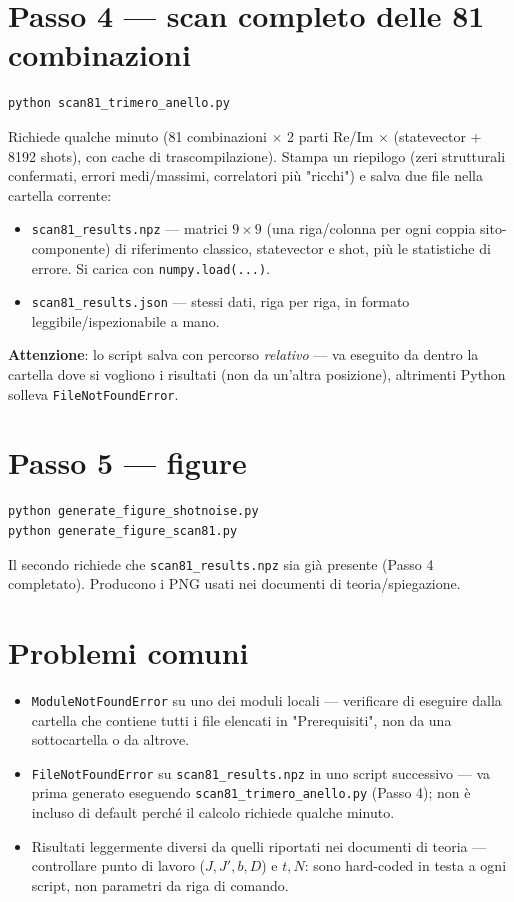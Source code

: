 \documentclass[11pt,a4paper]{article}
\begin{document}
\section*{Passo 4 --- scan completo delle 81 combinazioni}

\begin{verbatim}
python scan81_trimero_anello.py
\end{verbatim}
Richiede qualche minuto (81 combinazioni $\times$ 2 parti Re/Im $\times$
(statevector + 8192 shots), con cache di trascompilazione). Stampa un
riepilogo (zeri strutturali confermati, errori medi/massimi, correlatori più
"ricchi") e salva due file nella cartella corrente:
\begin{itemize}
\item \texttt{scan81\_results.npz} --- matrici $9\times9$ (una riga/colonna per
ogni coppia sito-componente) di riferimento classico, statevector e shot,
più le statistiche di errore. Si carica con \texttt{numpy.load(...)}.
\item \texttt{scan81\_results.json} --- stessi dati, riga per riga, in formato
leggibile/ispezionabile a mano.
\end{itemize}
\textbf{Attenzione}: lo script salva con percorso \emph{relativo} --- va
eseguito da dentro la cartella dove si vogliono i risultati (non da un'altra
posizione), altrimenti Python solleva \texttt{FileNotFoundError}.

\section*{Passo 5 --- figure}

\begin{verbatim}
python generate_figure_shotnoise.py
python generate_figure_scan81.py
\end{verbatim}
Il secondo richiede che \texttt{scan81\_results.npz} sia già presente (Passo 4
completato). Producono i PNG usati nei documenti di teoria/spiegazione.

\section*{Problemi comuni}

\begin{itemize}
\item \texttt{ModuleNotFoundError} su uno dei moduli locali --- verificare di
eseguire dalla cartella che contiene tutti i file elencati in
"Prerequisiti", non da una sottocartella o da altrove.
\item \texttt{FileNotFoundError} su \texttt{scan81\_results.npz} in uno script
successivo --- va prima generato eseguendo \texttt{scan81\_trimero\_anello.py}
(Passo 4); non è incluso di default perché il calcolo richiede qualche minuto.
\item Risultati leggermente diversi da quelli riportati nei documenti di teoria
--- controllare punto di lavoro ($J,J',b,D$) e $t,N$: sono hard-coded in testa
a ogni script, non parametri da riga di comando.
\end{itemize}
\end{document}
